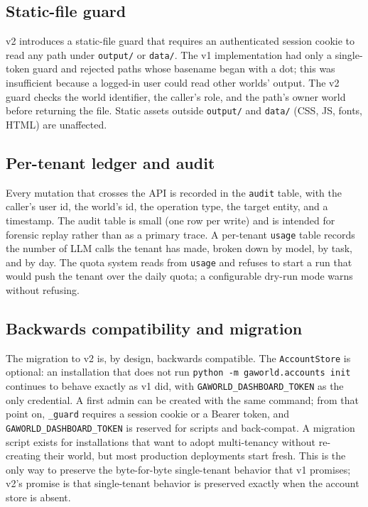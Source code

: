 \subsection{Static-file guard}

v2 introduces a static-file guard that requires an authenticated session
cookie to read any path under \texttt{output/} or \texttt{data/}.  The v1
implementation had only a single-token guard and rejected paths whose
basename began with a dot; this was insufficient because a logged-in user
could read other worlds' output.  The v2 guard checks the world
identifier, the caller's role, and the path's owner world before
returning the file.  Static assets outside \texttt{output/} and
\texttt{data/} (CSS, JS, fonts, HTML) are unaffected.

\subsection{Per-tenant ledger and audit}

Every mutation that crosses the API is recorded in the \texttt{audit}
table, with the caller's user id, the world's id, the operation type, the
target entity, and a timestamp.  The audit table is small (one row per
write) and is intended for forensic replay rather than as a primary
trace.  A per-tenant \texttt{usage} table records the number of LLM calls
the tenant has made, broken down by model, by task, and by day.  The
quota system reads from \texttt{usage} and refuses to start a run that
would push the tenant over the daily quota; a configurable dry-run mode
warns without refusing.

\subsection{Backwards compatibility and migration}

The migration to v2 is, by design, backwards compatible.  The
\texttt{AccountStore} is optional: an installation that does not run
\texttt{python -m gaworld.accounts init} continues to behave exactly as
v1 did, with \texttt{GAWORLD\_DASHBOARD\_TOKEN} as the only credential.
A first admin can be created with the same command; from that point on,
\texttt{\_guard} requires a session cookie or a Bearer token, and
\texttt{GAWORLD\_DASHBOARD\_TOKEN} is reserved for scripts and
back-compat.  A migration script exists for installations that want to
adopt multi-tenancy without re-creating their world, but most production
deployments start fresh.  This is the only way to preserve the byte-for-byte
single-tenant behavior that v1 promises; v2's promise is that single-tenant
behavior is preserved exactly when the account store is absent.
